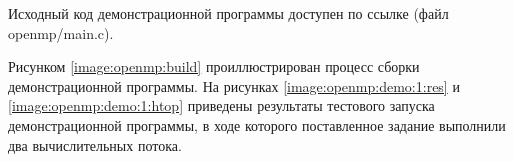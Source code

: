 Исходный код демонстрационной программы доступен по ссылке \cite{code} (файл openmp/main.c).

Рисунком \ref{image:openmp:build} проиллюстрирован процесс сборки демонстрационной программы. На рисунках \ref{image:openmp:demo:1:res} и \ref{image:openmp:demo:1:htop} приведены результаты тестового запуска демонстрационной программы, в ходе которого поставленное задание выполнили два вычислительных потока.


